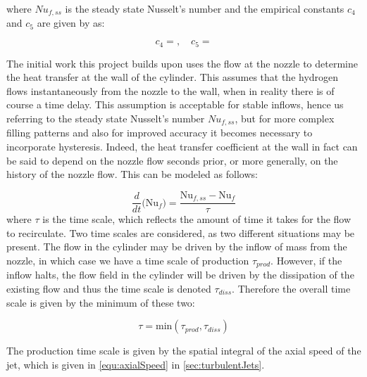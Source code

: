 \noindent where ${Nu}_{f,ss}$ is the steady state Nusselt's number and the empirical constants $c_4$ and $c_5$ are given by  as:

\begin{equation}
\label{equ:nusseltReynoldsConsts}
c_4 =   ,  \quad c_5 = 
\end{equation}

The initial work this project builds upon uses the flow at the nozzle to determine the heat transfer at the wall of the cylinder. This assumes that the hydrogen flows instantaneously from the nozzle to the wall, when in reality there is of course a time delay. This assumption is acceptable for stable inflows, hence us referring to the steady state Nusselt's number ${Nu}_{f,ss}$,  but for more complex filling patterns and also for improved accuracy it becomes necessary to incorporate hysteresis. Indeed, the heat transfer coefficient at the wall in fact can be said to depend on the nozzle flow seconds prior, or more generally, on the history of the nozzle flow. This can be modeled as follows:  

\begin{equation}
\frac{d}{dt}\Big(\text{Nu}_f \Big) = \frac{\text{Nu}_{f,ss}-\text{Nu}_f}{\tau}
\end{equation}
where $\tau$ is the time scale, which reflects the amount of time it takes for the flow to recirculate. Two time scales are considered, as two different situations may be present. The flow in the cylinder may be driven by the inflow of mass from the nozzle, in which case we have a time scale of production $\tau_{prod}$. However, if the inflow halts, the flow field in the cylinder will be driven by the dissipation of the existing flow and thus the time scale is denoted $\tau_{diss}$. Therefore the overall time scale is given by the minimum of these two: 

\begin{equation}
\tau = \text{min}\left(\tau_{prod},\tau_{diss}\right)
\end{equation}




\noindent The production time scale is given by the spatial integral of the axial speed of the jet, which is given in \cref{equ:axialSpeed} in \cref{sec:turbulentJets}.

